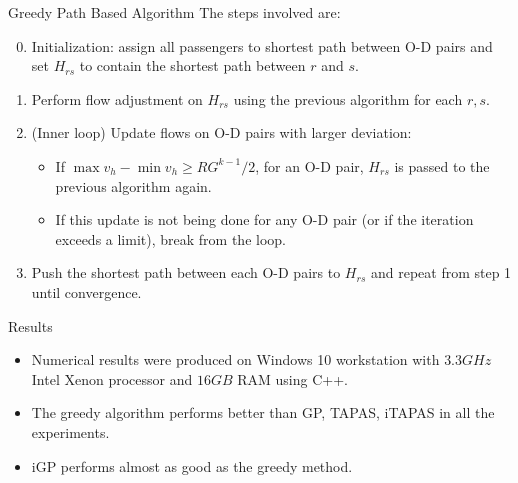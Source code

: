 \documentclass{beamer}
\begin{document}
\begin{frame}{Greedy Path Based Algorithm}
The steps involved are:
\begin{enumerate}
\setcounter{enumi}{-1}
    \item Initialization: assign all passengers to shortest
    path between O-D pairs and set $H_{rs}$ to contain
    the shortest path between $r$ and $s$.

    \item Perform flow adjustment on $H_{rs}$ using the
    previous algorithm for each $r,s$.

    \item (Inner loop) Update flows on O-D pairs with larger deviation:
    \begin{itemize}
    \item If $\max{v_h} - \min{v_h}\geq RG^{k-1}/2$,
    for an O-D pair, $H_{rs}$ is passed to the previous
    algorithm again.

    \item If this update is not being done for any
    O-D pair (or if the iteration exceeds a limit),
    break from the loop.
    \end{itemize}

    \item Push the shortest path between each O-D pairs to
    $H_{rs}$ and repeat from step 1 until convergence.
\end{enumerate}
\end{frame}


\begin{frame}
\end{frame}

\begin{frame}{Results}
\begin{itemize}
    \item Numerical results were produced on Windows 10
    workstation with $3.3GHz$ Intel Xenon processor and
    $16 GB$ RAM using C++.

    \item The greedy algorithm performs better than GP, TAPAS,
    iTAPAS in all the experiments.

    \item iGP performs almost as good as the greedy method.
\end{itemize}
\end{frame}
\end{document}
